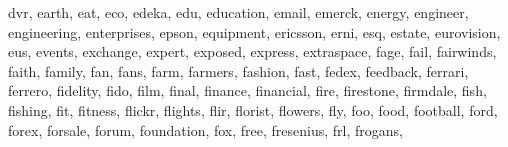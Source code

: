 \documentclass[letterpaper,10pt,english]{sphinxmanual}
\begin{document}
\begin{fulllineitems}
\begin{fulllineitems}
\textquotesingle{}dvr\textquotesingle{}, \textquotesingle{}earth\textquotesingle{}, \textquotesingle{}eat\textquotesingle{}, \textquotesingle{}eco\textquotesingle{}, \textquotesingle{}edeka\textquotesingle{}, \textquotesingle{}edu\textquotesingle{}, \textquotesingle{}education\textquotesingle{}, \textquotesingle{}email\textquotesingle{}, \textquotesingle{}emerck\textquotesingle{}, \textquotesingle{}energy\textquotesingle{}, \textquotesingle{}engineer\textquotesingle{}, \textquotesingle{}engineering\textquotesingle{}, \textquotesingle{}enterprises\textquotesingle{}, \textquotesingle{}epson\textquotesingle{}, \textquotesingle{}equipment\textquotesingle{}, \textquotesingle{}ericsson\textquotesingle{}, \textquotesingle{}erni\textquotesingle{}, \textquotesingle{}esq\textquotesingle{}, \textquotesingle{}estate\textquotesingle{}, \textquotesingle{}eurovision\textquotesingle{}, \textquotesingle{}eus\textquotesingle{}, \textquotesingle{}events\textquotesingle{}, \textquotesingle{}exchange\textquotesingle{}, \textquotesingle{}expert\textquotesingle{}, \textquotesingle{}exposed\textquotesingle{}, \textquotesingle{}express\textquotesingle{}, \textquotesingle{}extraspace\textquotesingle{}, \textquotesingle{}fage\textquotesingle{}, \textquotesingle{}fail\textquotesingle{}, \textquotesingle{}fairwinds\textquotesingle{}, \textquotesingle{}faith\textquotesingle{}, \textquotesingle{}family\textquotesingle{}, \textquotesingle{}fan\textquotesingle{}, \textquotesingle{}fans\textquotesingle{}, \textquotesingle{}farm\textquotesingle{}, \textquotesingle{}farmers\textquotesingle{}, \textquotesingle{}fashion\textquotesingle{}, \textquotesingle{}fast\textquotesingle{}, \textquotesingle{}fedex\textquotesingle{}, \textquotesingle{}feedback\textquotesingle{}, \textquotesingle{}ferrari\textquotesingle{}, \textquotesingle{}ferrero\textquotesingle{}, \textquotesingle{}fidelity\textquotesingle{}, \textquotesingle{}fido\textquotesingle{}, \textquotesingle{}film\textquotesingle{}, \textquotesingle{}final\textquotesingle{}, \textquotesingle{}finance\textquotesingle{}, \textquotesingle{}financial\textquotesingle{}, \textquotesingle{}fire\textquotesingle{}, \textquotesingle{}firestone\textquotesingle{}, \textquotesingle{}firmdale\textquotesingle{}, \textquotesingle{}fish\textquotesingle{}, \textquotesingle{}fishing\textquotesingle{}, \textquotesingle{}fit\textquotesingle{}, \textquotesingle{}fitness\textquotesingle{}, \textquotesingle{}flickr\textquotesingle{}, \textquotesingle{}flights\textquotesingle{}, \textquotesingle{}flir\textquotesingle{}, \textquotesingle{}florist\textquotesingle{}, \textquotesingle{}flowers\textquotesingle{}, \textquotesingle{}fly\textquotesingle{}, \textquotesingle{}foo\textquotesingle{}, \textquotesingle{}food\textquotesingle{}, \textquotesingle{}football\textquotesingle{}, \textquotesingle{}ford\textquotesingle{}, \textquotesingle{}forex\textquotesingle{}, \textquotesingle{}forsale\textquotesingle{}, \textquotesingle{}forum\textquotesingle{}, \textquotesingle{}foundation\textquotesingle{}, \textquotesingle{}fox\textquotesingle{}, \textquotesingle{}free\textquotesingle{}, \textquotesingle{}fresenius\textquotesingle{}, \textquotesingle{}frl\textquotesingle{}, \textquotesingle{}frogans\textquotesingle{}, 
\end{fulllineitems}
\end{fulllineitems}
\end{document}
